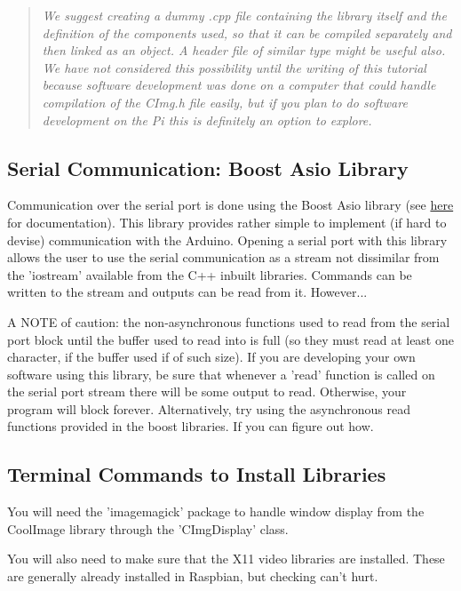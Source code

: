 \documentclass[a4paper]{article}
\begin{document}
			\begin{quote}
				\emph{We suggest creating a dummy .cpp file containing the library itself and the definition of the components used, so that it can be compiled separately and then linked as an object.
				A header file of similar type might be useful also.
				We have not considered this possibility until the writing of this tutorial because software development was done on a computer that could handle compilation of the CImg.h file easily, but if you plan to do software development on the Pi this is definitely an option to explore.}
			\end{quote}

	\subsection*{Serial Communication: Boost Asio Library}
			
			Communication over the serial port is done using the Boost Asio library (see \href{http://www.boost.org/doc/libs/1_54_0/doc/html/boost_asio.html}{here} for documentation).
			This library provides rather simple to implement (if hard to devise) communication with the Arduino.
			Opening a serial port with this library allows the user to use the serial communication as a stream not dissimilar from the 'iostream' available from the C++ inbuilt libraries.
			Commands can be written to the stream and outputs can be read from it.
			However...
			
			A NOTE of caution: the non-asynchronous functions used to read from the serial port block until the buffer used to read into is full (so they must read at least one character, if the buffer used if of such size).
			If you are developing your own software using this library, be sure that whenever a 'read' function is called on the serial port stream there will be some output to read.
			Otherwise, your program will block forever.
			Alternatively, try using the asynchronous read functions provided in the boost libraries.
			If you can figure out how.
			
	\subsection*{Terminal Commands to Install Libraries}
	
			You will need the 'imagemagick' package to handle window display from the CoolImage library through the 'CImgDisplay' class.
			
			You will also need to make sure that the X11 video libraries are installed.
			These are generally already installed in Raspbian, but checking can't hurt.
			
\end{document}
